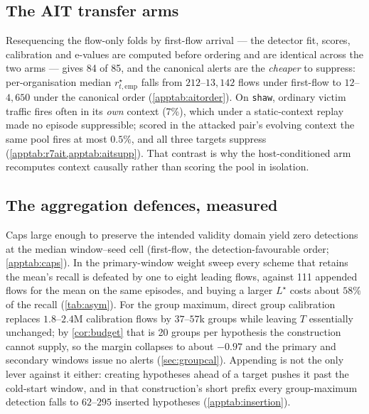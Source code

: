 \documentclass[conference]{IEEEtran}
\begin{document}
\subsection{The AIT transfer arms}\label{app:ait}



Resequencing the flow-only folds by first-flow arrival --- the detector fit, scores, calibration and
e-values are computed before ordering and are identical across the two arms --- gives 84 of 85, and the
canonical alerts are the \emph{cheaper} to suppress: per-organisation median $r^{\star}_{t,\mathrm{emp}}$ falls from
$212$--$13{,}142$ flows under first-flow to $12$--$4{,}650$ under the canonical order
(\cref{apptab:aitorder}). On \texttt{shaw}, ordinary victim traffic fires often in its \emph{own}
context (7\%), which under a static-context replay made no episode suppressible; scored in the attacked
pair's evolving context the same pool fires at most $0.5\%$, and all three targets suppress
(\cref{apptab:r7ait,apptab:aitsupp}). That contrast is why the host-conditioned arm recomputes context
causally rather than scoring the pool in isolation.





\subsection{The aggregation defences, measured}\label{app:defences}

Caps large enough to preserve the intended validity domain yield zero detections at the median
window--seed cell (first-flow, the detection-favourable order; \cref{apptab:caps}). In the
primary-window weight sweep every scheme that retains the mean's recall is defeated by one to eight
leading flows, against 111 appended flows for the mean on the same episodes, and buying a larger
$L^{\star}$ costs about $58\%$ of the recall (\cref{tab:asym}). For the group maximum, direct group
calibration replaces $1.8$--$2.4$M calibration flows by $37$--$57$k groups while leaving $T$ essentially
unchanged; by \cref{cor:budget} that is 20 groups per hypothesis the construction cannot supply, so the
margin collapses to about $-0.97$ and the primary and secondary windows issue no alerts
(\cref{sec:groupcal}). Appending is not the only lever against it either: creating hypotheses ahead of a
target pushes it past the cold-start window, and in that construction's short prefix every
group-maximum detection falls to $62$--$295$ inserted hypotheses (\cref{apptab:insertion}).
\end{document}
